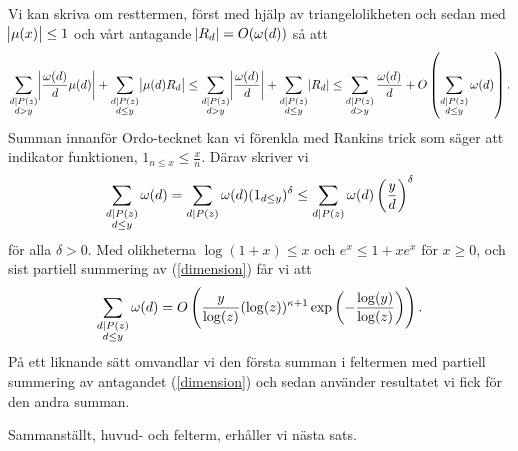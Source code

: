 Vi kan skriva om resttermen, först med hjälp av triangelolikheten och sedan med $\abs{\mu(x)} \leq 1$ och vårt antagande $\abs{R_d} = O(\omega(d))$ så att
\begin{align*}
    \sum_{\substack{d \mid P(z) \\ d > y}} \abs{\frac{\omega(d)}{d} \mu(d)} + \sum_{\substack{d \mid P(z)  \\ d \leq y}} \abs{ \mu(d) R_d} \leq 
    \sum_{\substack{d \mid P(z) \\ d > y}} \abs{\frac{\omega(d)}{d}} + \sum_{\substack{d \mid P(z)  \\ d \leq y}} \abs{R_d} \leq
    \sum_{\substack{d \mid P(z) \\ d > y}} \frac{\omega(d)}{d} + O\left(\sum_{\substack{d \mid P(z)  \\ d \leq y}} \omega(d)\right).
\end{align*}
Summan innanför Ordo-tecknet kan vi förenkla med Rankins trick som säger att indikator funktionen, \(1_{n \leq x} \leq \frac{x}{n}\). Därav skriver vi 
\begin{align*}
    \sum_{\substack{d \mid P(z)  \\ d \leq y}} \omega(d) =
    \sum_{\substack{d \mid P(z)}} \omega(d) (1_{d \leq y})^{\delta} \leq
    \sum_{\substack{d \mid P(z)}} \omega(d) \left(\frac{y}{d}\right)^{\delta}  
\end{align*}
för alla \(\delta > 0\). Med olikheterna \(\log(1 + x) \leq x\) och \(e^x \leq 1 + x e^x\) för $x \geq 0$, och sist partiell summering av (\ref{dimension}) får vi att
\begin{align*}
    \sum_{\substack{d \mid P(z)  \\ d \leq y}} \omega(d) = O\left( \frac{y}{\log(z)} (\log(z))^{\kappa + 1} \exp{\left(- \frac{\log(y)}{\log(z)} \right)} \right).
\end{align*}
På ett liknande sätt omvandlar vi den första summan i feltermen med partiell summering av antagandet (\ref{dimension}) och sedan använder resultatet vi fick för den andra summan. 

Sammanställt, huvud- och felterm, erhåller vi nästa sats.

